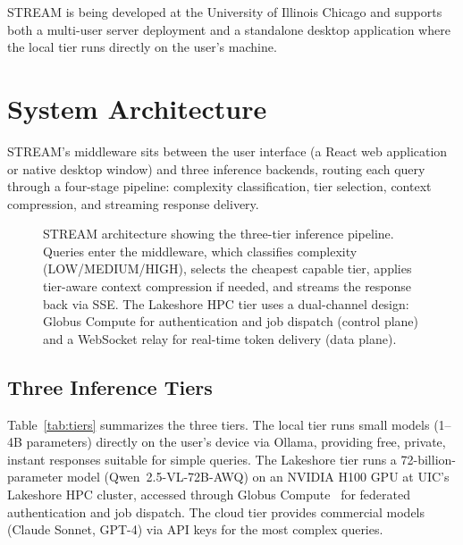 \documentclass[manuscript, review]{acmart}
\begin{document}
STREAM is being developed at the University of Illinois Chicago and supports both a multi-user server deployment and a standalone desktop application where the local tier runs directly on the user's machine.


\section{System Architecture}
\label{sec:architecture}

STREAM's middleware sits between the user interface (a React web application or native desktop window) and three inference backends, routing each query through a four-stage pipeline: complexity classification, tier selection, context compression, and streaming response delivery.

\begin{figure}[t]
    \centering
    \caption{STREAM architecture showing the three-tier inference pipeline. Queries enter the middleware, which classifies complexity (LOW/MEDIUM/HIGH), selects the cheapest capable tier, applies tier-aware context compression if needed, and streams the response back via SSE. The Lakeshore HPC tier uses a dual-channel design: Globus Compute for authentication and job dispatch (control plane) and a WebSocket relay for real-time token delivery (data plane).}
    \label{fig:architecture}
\end{figure}

\subsection{Three Inference Tiers}

Table~\ref{tab:tiers} summarizes the three tiers. The local tier runs small models (1--4B parameters) directly on the user's device via Ollama, providing free, private, instant responses suitable for simple queries. The Lakeshore tier runs a 72-billion-parameter model (Qwen~2.5-VL-72B-AWQ) on an NVIDIA H100 GPU at UIC's Lakeshore HPC cluster, accessed through Globus Compute~\cite{globuscompute2024} for federated authentication and job dispatch. The cloud tier provides commercial models (Claude Sonnet, GPT-4) via API keys for the most complex queries.
\end{document}
